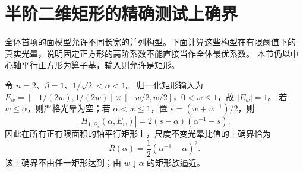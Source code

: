 \section{半阶二维矩形的精确测试上确界}\label{rect:section}

全体首项的面模型允许不同长宽的并列构型。下面计算这些构型在有限阈值下的
真实光晕，说明固定正方形的高阶系数不能直接当作全体最优系数。
本节仍以中心轴平行正方形为算子基，输入则允许是矩形。

\begin{theorem}[矩形类的精确公式]\label{rect:exact}
令 $n=2$、$\beta=1$、$1/\sqrt2<\alpha<1$。
归一化矩形输入为
$E_w=[-1/(2w),1/(2w)]\times[-w/2,w/2]$，$0<w\le1$，故 $|E_w|=1$。
若 $w\le\alpha$，则严格光晕为空；若 $\alpha<w\le1$，置
$s=(w+w^{-1})/2$，则
\[
 |H_{1,\mathcal Q_c}(\alpha,E_w)|=2(s-\alpha)(\alpha^{-1}-s).
\]
因此在所有正有限面积的轴平行矩形上，尺度不变光晕比值的上确界恰为
\begin{equation}\label{rect:sup}
 R(\alpha)=\frac12(\alpha^{-1}-\alpha)^2.
\end{equation}
该上确界不由任一矩形达到；由 $w\downarrow\alpha$ 的矩形族逼近。
\end{theorem}
